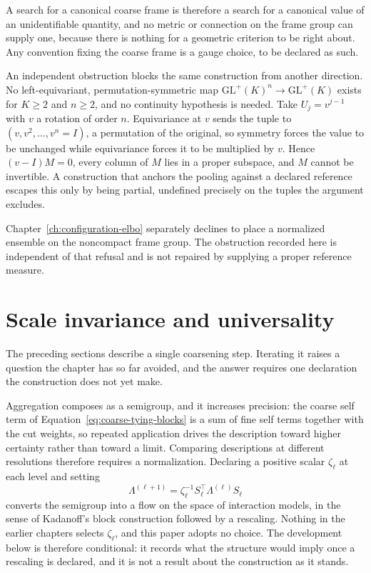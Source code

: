 A search for a canonical coarse frame is therefore a search for a canonical value of an unidentifiable quantity, and no metric or connection on the frame group can supply one, because there is nothing for a geometric criterion to be right about. Any convention fixing the coarse frame is a gauge choice, to be declared as such.

An independent obstruction blocks the same construction from another direction. No left-equivariant, permutation-symmetric map \(\mathrm{GL}^+(K)^n\to\mathrm{GL}^+(K)\) exists for \(K\geq 2\) and \(n\geq 2\), and no continuity hypothesis is needed. Take \(U_j=v^{j-1}\) with \(v\) a rotation of order \(n\). Equivariance at \(v\) sends the tuple to \((v,v^2,\dots,v^n=I)\), a permutation of the original, so symmetry forces the value to be unchanged while equivariance forces it to be multiplied by \(v\). Hence \((v-I)M=0\), every column of \(M\) lies in a proper subspace, and \(M\) cannot be invertible. A construction that anchors the pooling against a declared reference escapes this only by being partial, undefined precisely on the tuples the argument excludes.

Chapter~\ref{ch:configuration-elbo} separately declines to place a normalized ensemble on the noncompact frame group. The obstruction recorded here is independent of that refusal and is not repaired by supplying a proper reference measure.

\section{Scale invariance and universality}
\label{sec:coarse-universality}

The preceding sections describe a single coarsening step. Iterating it raises a question the chapter has so far avoided, and the answer requires one declaration the construction does not yet make.

Aggregation composes as a semigroup, and it increases precision: the coarse self term of Equation~\eqref{eq:coarse-tying-blocks} is a sum of fine self terms together with the cut weights, so repeated application drives the description toward higher certainty rather than toward a limit. Comparing descriptions at different resolutions therefore requires a normalization. Declaring a positive scalar \(\zeta_\ell\) at each level and setting
\begin{equation}
\Lambda^{(\ell+1)}
=\zeta_\ell^{-1}S_\ell^{\top}\Lambda^{(\ell)}S_\ell
\label{eq:rescaled-aggregation-flow}
\end{equation}
converts the semigroup into a flow on the space of interaction models, in the sense of Kadanoff's block construction followed by a rescaling. Nothing in the earlier chapters selects \(\zeta_\ell\), and this paper adopts no choice. The development below is therefore conditional: it records what the structure would imply once a rescaling is declared, and it is not a result about the construction as it stands.


